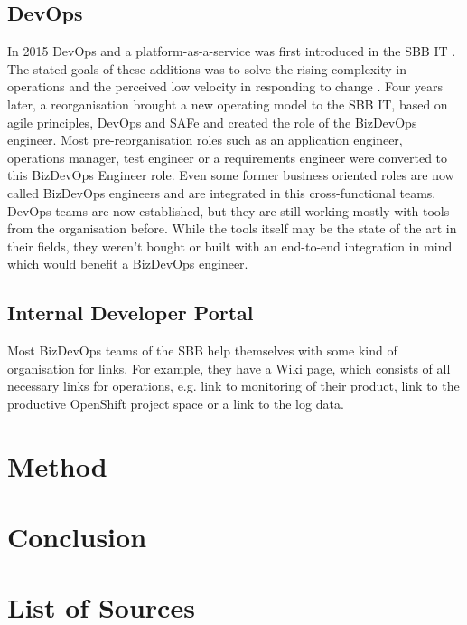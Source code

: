 \documentclass[a4paper,12pt]{article}
\begin{document}
    \subsection{DevOps}
    \label{subsec:sbbdevops}
    In 2015 DevOps and a platform-as-a-service was first introduced in the SBB IT .
    The stated goals of these additions was to solve the rising complexity in operations and the perceived low velocity
    in responding to change\parencite{sbbdevops} .
    Four years later, a reorganisation brought a new operating model to the SBB IT, based on agile principles, DevOps and SAFe
    and created the role of the BizDevOps engineer\parencite{sbbagile}.
    Most pre-reorganisation roles such as an application engineer, operations manager, test engineer or a requirements engineer
    were converted to this BizDevOps Engineer role.
    Even some former business oriented roles are now called BizDevOps engineers and are integrated in this cross-functional
    teams.
    DevOps teams are now established, but they are still working mostly with tools from the organisation before.
    While the tools itself may be the state of the art in their fields, they weren't bought or built with an end-to-end
    integration in mind which would benefit a BizDevOps engineer.

    \subsection{Internal Developer Portal}
    \label{subsec:sbbportal}
    Most BizDevOps teams of the SBB help themselves with some kind of organisation for links.
    For example, they have a Wiki page, which consists of all necessary links for operations, e.g. link to monitoring
    of their product,    link to the productive OpenShift project space or a link to the log data.


    \section{Method}
    \label{sec:method}


    \section{Conclusion}
    \label{sec:conclusion}
    \pagebreak


    \section{List of Sources}
    \label{sec:bibliograhpy}
    \printbibliography[heading=none]
\end{document}
